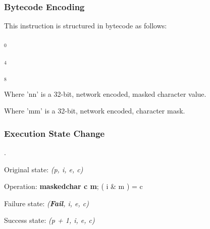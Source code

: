 \subsubsection{Bytecode Encoding}

This instruction is structured in bytecode as follows:

$_0$\ 


$_4$\

$_8$\
\fbox{%
  \parbox{20pt}{%
mm
  }%
}

Where 'nn' is a 32-bit, network encoded, masked character value.

Where 'mm' is a 32-bit, network encoded, character mask.

\subsubsection{Execution State Change}

.

Original state: \textit{(p, i, e, c)}

Operation: \textbf{maskedchar c m}; ( i \& m ) = c

Failure state: \textit{(\textbf{Fail}, i, e, c)}

Success state: \textit{(p + 1, i, e, c)}

